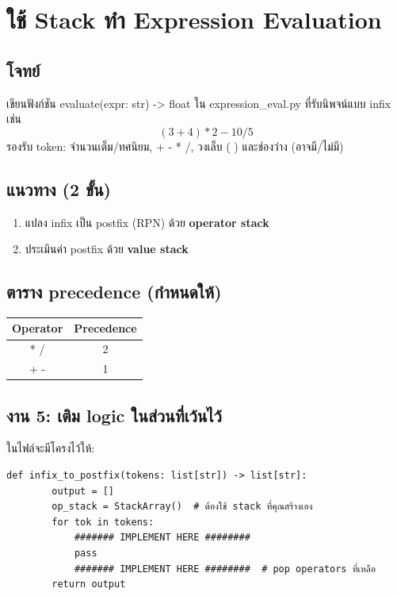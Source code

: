 \documentclass[12pt,a4paper]{article}
\begin{document}
	\newpage
	\section{ใช้ Stack ทำ Expression Evaluation}
	\subsection*{โจทย์}
	เขียนฟังก์ชัน {evaluate(expr: str) -> float} ใน {expression\_eval.py} ที่รับนิพจน์แบบ infix เช่น
	\[
	(3 + 4) * 2 - 10/5
	\]
	รองรับ token: จำนวนเต็ม/ทศนิยม, {+ - * /}, วงเล็บ {( )} และช่องว่าง (อาจมี/ไม่มี)
	
	\subsection*{แนวทาง (2 ขั้น)}
	\begin{enumerate}[label=\arabic*.]
		\item แปลง infix เป็น postfix (RPN) ด้วย \textbf{operator stack}
		\item ประเมินค่า postfix ด้วย \textbf{value stack}
	\end{enumerate}
	
	\subsection*{ตาราง precedence (กำหนดให้)}
	\begin{center}
		\begin{tabular}{c c}
			\toprule
			Operator & Precedence\\
			\midrule
			{* /} & 2\\
			{+ -} & 1\\
			\bottomrule
		\end{tabular}
	\end{center}
	
	\subsection*{งาน 5: เติม logic ในส่วนที่เว้นไว้}
	ในไฟล์จะมีโครงไว้ให้:
	\begin{lstlisting}[style=py]
	def infix_to_postfix(tokens: list[str]) -> list[str]:
		output = []
		op_stack = StackArray()  # ต้องใช้ stack ที่คุณสร้างเอง
		for tok in tokens:
			####### IMPLEMENT HERE ########
			pass
			####### IMPLEMENT HERE ########  # pop operators ที่เหลือ
		return output
	\end{lstlisting}
	
\end{document}
